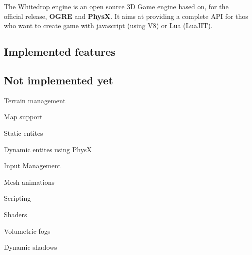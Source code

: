 The Whitedrop engine is an open source 3\+D Game engine based on, for the official release, {\bfseries O\+G\+R\+E} and {\bfseries Phys\+X}. It aims at providing a complete A\+P\+I for thos who want to create game with javascript (using V8) or Lua (Lua\+J\+I\+T).

\subsection*{Implemented features}

\subsection*{Not implemented yet}


\begin{DoxyItemize}
\item Terrain management
\item Map support
\item Static entites
\item Dynamic entites using Phys\+X
\item Input Management
\item Mesh animations
\item Scripting
\item Shaders
\item Volumetric fogs
\item Dynamic shadows 
\end{DoxyItemize}